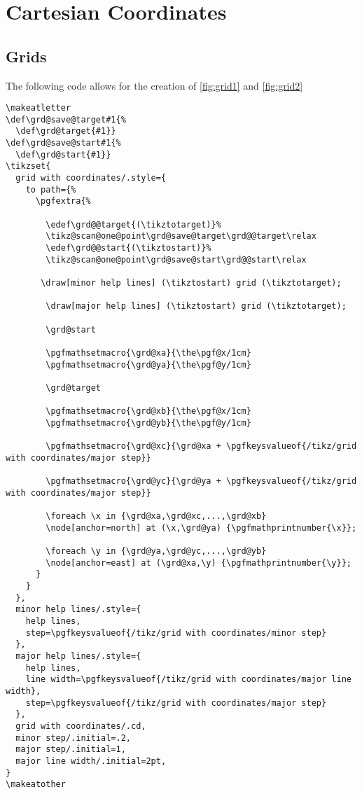 \chapter{Cartesian Coordinates}



\section{Grids}

The following code allows for the creation of \autoref{fig:grid1} and \autoref{fig:grid2}

\begin{verbatim}
\makeatletter
\def\grd@save@target#1{%
  \def\grd@target{#1}}
\def\grd@save@start#1{%
  \def\grd@start{#1}}
\tikzset{
  grid with coordinates/.style={
    to path={%
      \pgfextra{%

        \edef\grd@@target{(\tikztotarget)}%
        \tikz@scan@one@point\grd@save@target\grd@@target\relax
        \edef\grd@@start{(\tikztostart)}%
        \tikz@scan@one@point\grd@save@start\grd@@start\relax

       \draw[minor help lines] (\tikztostart) grid (\tikztotarget);

        \draw[major help lines] (\tikztostart) grid (\tikztotarget);

        \grd@start

        \pgfmathsetmacro{\grd@xa}{\the\pgf@x/1cm}
        \pgfmathsetmacro{\grd@ya}{\the\pgf@y/1cm}

        \grd@target

        \pgfmathsetmacro{\grd@xb}{\the\pgf@x/1cm}
        \pgfmathsetmacro{\grd@yb}{\the\pgf@y/1cm}

        \pgfmathsetmacro{\grd@xc}{\grd@xa + \pgfkeysvalueof{/tikz/grid with coordinates/major step}}

        \pgfmathsetmacro{\grd@yc}{\grd@ya + \pgfkeysvalueof{/tikz/grid with coordinates/major step}}

        \foreach \x in {\grd@xa,\grd@xc,...,\grd@xb}
        \node[anchor=north] at (\x,\grd@ya) {\pgfmathprintnumber{\x}};

        \foreach \y in {\grd@ya,\grd@yc,...,\grd@yb}
        \node[anchor=east] at (\grd@xa,\y) {\pgfmathprintnumber{\y}};
      }
    }
  },
  minor help lines/.style={
    help lines,
    step=\pgfkeysvalueof{/tikz/grid with coordinates/minor step}
  },
  major help lines/.style={
    help lines,
    line width=\pgfkeysvalueof{/tikz/grid with coordinates/major line width},
    step=\pgfkeysvalueof{/tikz/grid with coordinates/major step}
  },
  grid with coordinates/.cd,
  minor step/.initial=.2,
  major step/.initial=1,
  major line width/.initial=2pt,
}
\makeatother
\end{verbatim}

